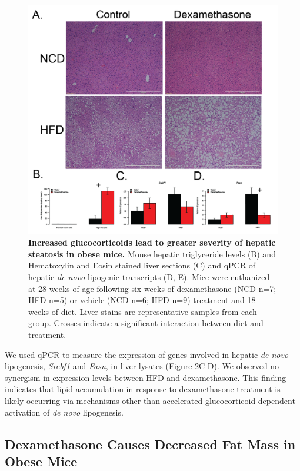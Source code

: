 \documentclass[11pt]{article} %
\begin{document}
\begin{figure}
  \begin{center}
    \includegraphics[width=\textwidth]{Figures_Figure_2.png}
  \end{center}
  \caption{\textbf{Increased glucocorticoids lead to greater severity of
hepatic steatosis in obese mice.}
Mouse hepatic triglyceride levels (B) and Hematoxylin and Eosin stained
liver sections (C) and qPCR of hepatic \emph{de novo} lipogenic
transcripts (D, E). Mice were euthanized at 28 weeks of age following
six weeks of dexamethasone (NCD n=7; HFD n=5) or vehicle (NCD n=6; HFD
n=9) treatment and 18 weeks of diet. Liver stains are representative
samples from each group. Crosses indicate a significant interaction
between diet and treatment.}
 \label{fig:2}
\end{figure}

We used qPCR to measure the expression of genes involved in hepatic
\emph{de novo} lipogenesis, \emph{Srebf1} and \emph{Fasn}, in liver
lysates (Figure 2C-D). We observed no synergism in expression levels
between HFD and dexamethasone. This finding indicates that lipid
accumulation in response to dexamethasone treatment is likely occurring
via mechanisms other than accelerated glucocorticoid-dependent
activation of \emph{de novo} lipogenesis.

\subsection*{Dexamethasone Causes Decreased Fat Mass in Obese
Mice}
\end{document}
